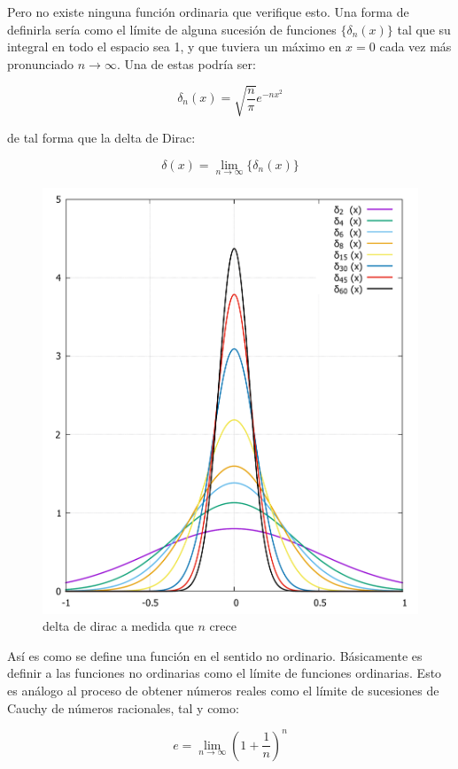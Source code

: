 \documentclass[12pt]{book}
\newcommand{\parentesis}[1]{\left( #1  \right)}
\begin{document}
Pero no existe ninguna función ordinaria que verifique esto. Una forma de definirla sería como el límite de alguna  sucesión de funciones $\{ \delta_n (x) \}$ tal que su integral en todo el espacio sea 1, y que tuviera un máximo en $x=0$ cada vez más pronunciado $n \rightarrow \infty$. Una de estas podría ser:

$$  \delta_n (x) = \sqrt{\dfrac{n}{\pi}} e^{-nx^2} $$

de tal forma que la delta de Dirac:

$$ \delta (x) = \lim_{n \rightarrow \infty} \{  \delta_n (x)  \}  $$

\begin{figure}[h!] \centering
\includegraphics[scale=0.5]{deltadirac.pdf}
\caption{delta de dirac a medida que $n$ crece}
\end{figure}

Así es como se define una función en el sentido no ordinario. Básicamente es definir a las funciones no ordinarias como el límite de funciones ordinarias. Esto es análogo al proceso de obtener números reales como el límite de sucesiones de Cauchy de números racionales, tal y como:

$$ e = \lim_{n \rightarrow \infty} \parentesis{1+\dfrac{1}{n}}^n $$
\end{document}
